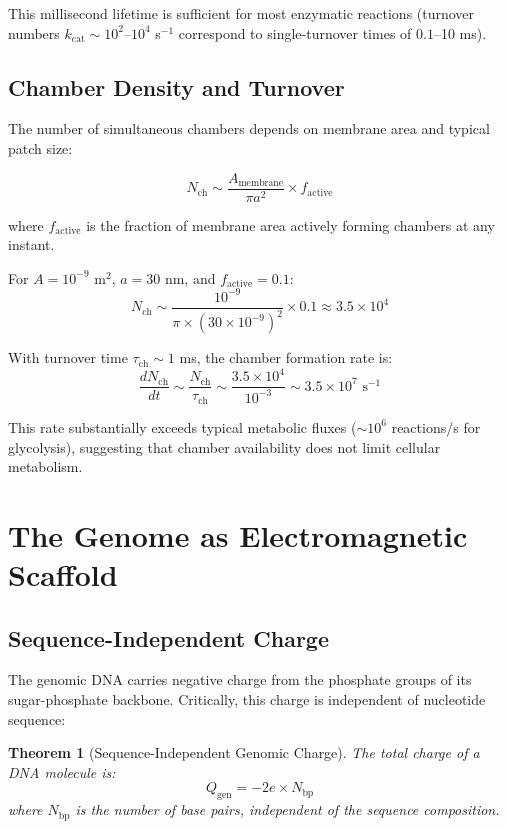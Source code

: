 \documentclass[twocolumn,10pt,aps,prd,superscriptaddress,floatfix,nofootinbib]{revtex4-2}
\newtheorem{theorem}{Theorem}[section]
\theoremstyle{remark}
\newcommand{\Qgen}{Q_{\mathrm{gen}}}
\newcommand{\taucham}{\tau_{\mathrm{ch}}}
\newcommand{\Ncham}{N_{\mathrm{ch}}}
\begin{document}
This millisecond lifetime is sufficient for most enzymatic reactions (turnover numbers $k_{\mathrm{cat}} \sim 10^{2}$--$10^{4}$ s$^{-1}$ correspond to single-turnover times of $0.1$--10 ms).

\subsection{Chamber Density and Turnover}

The number of simultaneous chambers depends on membrane area and typical patch size:

\begin{equation}
\Ncham \sim \frac{A_{\mathrm{membrane}}}{\pi a^2} \times f_{\mathrm{active}}
\end{equation}

where $f_{\mathrm{active}}$ is the fraction of membrane area actively forming chambers at any instant.

For $A = 10^{-9}$ m$^2$, $a = 30$ nm, and $f_{\mathrm{active}} = 0.1$:
\begin{equation}
\Ncham \sim \frac{10^{-9}}{\pi \times (30 \times 10^{-9})^2} \times 0.1 \approx 3.5 \times 10^{4}
\end{equation}

With turnover time $\taucham \sim 1$ ms, the chamber formation rate is:
\begin{equation}
\frac{d\Ncham}{dt} \sim \frac{\Ncham}{\taucham} \sim \frac{3.5 \times 10^{4}}{10^{-3}} \sim 3.5 \times 10^{7} \text{ s}^{-1}
\end{equation}

This rate substantially exceeds typical metabolic fluxes ($\sim 10^{6}$ reactions/s for glycolysis), suggesting that chamber availability does not limit cellular metabolism.

\section{The Genome as Electromagnetic Scaffold}
\label{sec:genome}

\subsection{Sequence-Independent Charge}

The genomic DNA carries negative charge from the phosphate groups of its sugar-phosphate backbone. Critically, this charge is independent of nucleotide sequence:

\begin{theorem}[Sequence-Independent Genomic Charge]
\label{thm:sequence_independent}
The total charge of a DNA molecule is:
\begin{equation}
\Qgen = -2e \times N_{\mathrm{bp}}
\label{eq:genome_charge}
\end{equation}
where $N_{\mathrm{bp}}$ is the number of base pairs, independent of the sequence composition.
\end{theorem}
\end{document}
